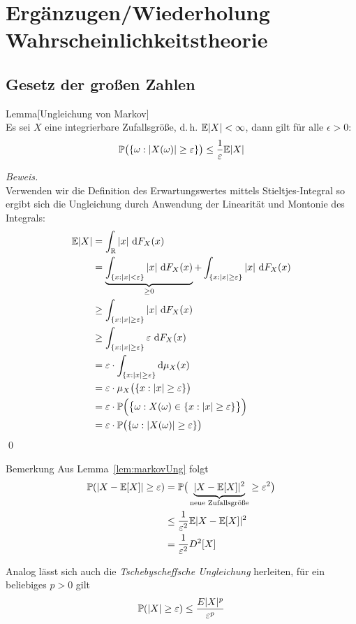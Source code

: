 
\newpage
\section{Ergänzugen/Wiederholung Wahrscheinlichkeitstheorie}

\subsection{Gesetz der großen Zahlen}
\begin{colbox}{Lemma}[Ungleichung von Markov]\label{lem:markovUng}\ \\
    Es sei $X$ eine integrierbare Zufallsgröße, d.\,h. $\E|X|<\infty$, dann gilt für alle $\epsilon>0$:
    \[
    \P\big(\{\omega:|X(\omega)|\geq\epsilon\}\big) \leq \frac{1}{\epsilon}\E|X|
    \]
\end{colbox}
\textit{Beweis.} \\
Verwenden wir die Definition des Erwartungswertes mittels Stieltjes-Integral so ergibt sich die Ungleichung durch 
Anwendung der Linearität und Montonie des Integrals:
\begin{align*}
    \E|X| &= \int_{\R} |x| \, \diff F_X(x) \\
    &= \underbrace{\int_{\{x:|x|<\epsilon\}} |x| \, \diff F_X(x)}_{\geq 0} + 
    \int_{\{x:|x|\geq\epsilon\}} |x| \, \diff F_X(x) \\
    &\geq \int_{\{x:|x|\geq\epsilon\}} |x| \, \diff F_X(x) \\
    &\geq \int_{\{x:|x|\geq\epsilon\}} \epsilon \, \diff F_X(x) \\
    &= \epsilon\cdot \int_{\{x:|x|\geq\epsilon\}} \diff \mu_X(x) \\
    &= \epsilon\cdot\mu_X\big(\{x:|x|\geq\epsilon\}\big) \\
    &= \epsilon\cdot \P\Big(\big\{\omega:X(\omega)\in\{x:|x|\geq\epsilon\}\big\}\Big) \\
    &= \epsilon\cdot \P\big(\{\omega:|X(\omega)|\geq\epsilon\}\big) 
\end{align*}
\qed 
\begin{colbox}{Bemerkung}
    Aus Lemma~\ref{lem:markovUng} folgt
    \begin{align*}
        \P(|X-\E[X]|\geq\epsilon) &= \P\big( \underbrace{|X-\E[X]|^2}_{\text{neue Zufallsgröße}}\geq\epsilon^2\big) \\
        &\leq \frac{1}{\epsilon^2}\E|X-\E[X]|^2 \\
        &= \frac{1}{\epsilon^2} D^2[X]
    \end{align*}
\end{colbox}
Analog lässt sich auch die \emph{Tschebyscheffsche Ungleichung} herleiten, für ein beliebiges $p>0$ gilt
\[\P(|X|\geq\epsilon) \leq \frac{E|X|^p}{\varepsilon^p}\]

